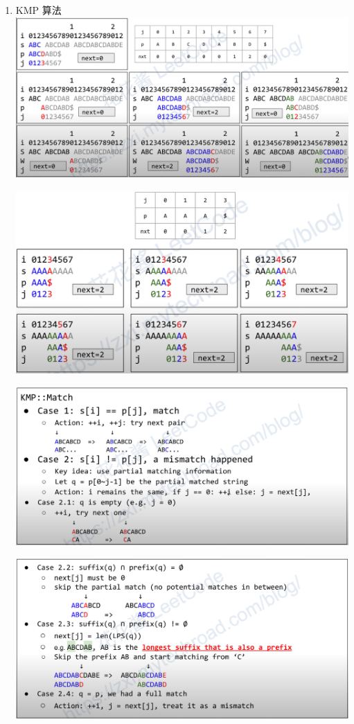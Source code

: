 \documentclass[9pt, b5paaper]{book}
\begin{document}
\begin{enumerate}
\item KMP 算法
\label{sec-7-0-2-2}
\includegraphics[width=.9\linewidth]{./pic/kmp.png}

\includegraphics[width=.9\linewidth]{./pic/kmp2.png}

\includegraphics[width=.9\linewidth]{./pic/kmp3.png}

\includegraphics[width=.9\linewidth]{./pic/kmp4.png}


\end{enumerate}
\end{document}
